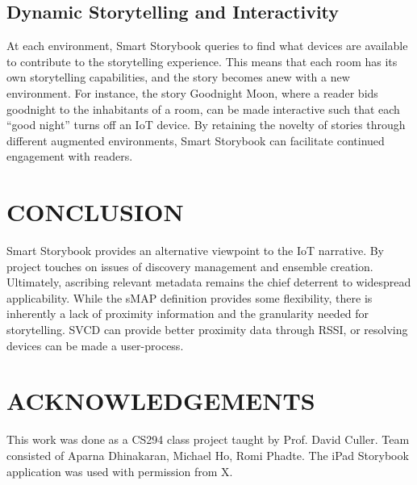 \documentclass{sigchi}
\begin{document}
\subsection{Dynamic Storytelling and Interactivity}
At each environment, Smart Storybook queries to find what devices are available to contribute to the storytelling experience. This means that each room has its own storytelling capabilities, and the story becomes anew with a new environment. For instance, the story Goodnight Moon, where a reader bids goodnight to the inhabitants of a room, can be made interactive such that each “good night” turns off an IoT device. By retaining the novelty of stories through different augmented environments, Smart Storybook can facilitate continued engagement with readers. 



\section{CONCLUSION}
Smart Storybook provides an alternative viewpoint to the IoT narrative. By project touches on issues of discovery management and ensemble creation. Ultimately, ascribing relevant metadata remains the chief deterrent to widespread applicability. While the sMAP definition provides some flexibility,  there is inherently a lack of proximity information and the granularity needed for storytelling. SVCD can provide better proximity data through RSSI, or resolving devices can be made a user-process.


\section{ACKNOWLEDGEMENTS}
This work was done as a CS294 class project taught by Prof. David Culler. 
Team consisted of Aparna Dhinakaran, Michael Ho, Romi Phadte. 
The iPad Storybook application was used with permission from X. 

\balance


\end{document}
